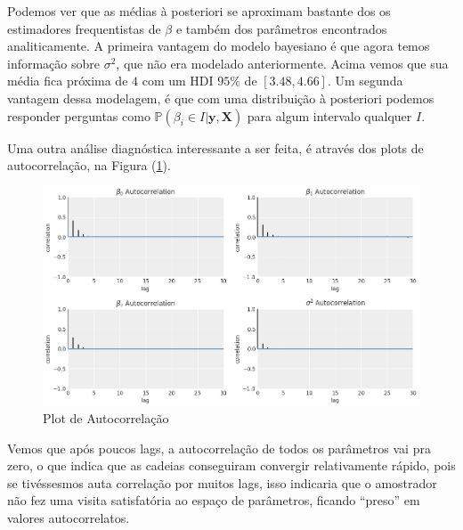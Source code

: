 \documentclass[12pt,letterpaper]{article}
\newcommand{\bd}[1]{\boldsymbol{#1}}
\begin{document}
	Podemos ver que as médias à posteriori se aproximam bastante dos os estimadores frequentistas de $\beta$ e também dos parâmetros encontrados analiticamente. A primeira vantagem do modelo bayesiano é que agora temos informação sobre $\sigma^2$, que não era modelado anteriormente. Acima vemos que sua média fica próxima de $4$ com um HDI $95\%$ de $[3.48,4.66]$. Um segunda vantagem dessa modelagem, é que com uma distribuição à posteriori podemos responder perguntas como $\mathbb{P}(\beta_i\in I|\bd y,\bd X)$ para algum intervalo qualquer $I$. 
	
	Uma outra análise diagnóstica interessante a ser feita, é através dos plots de autocorrelação, na Figura (\ref{autocorr1}).
	
	\begin{figure}[!htb]
		\centering
		\includegraphics[scale=0.5]{../images/autocorrelation1.png}
		
		\caption{Plot de Autocorrelação}
		\label{autocorr1}
	\end{figure}

	Vemos que após poucos lags, a autocorrelação de todos os parâmetros vai pra zero, o que indica que as cadeias conseguiram convergir relativamente rápido, pois se tivéssesmos auta correlação por muitos lags, isso indicaria que o amostrador não fez uma visita satisfatória ao espaço de parâmetros, ficando ``preso'' em valores autocorrelatos.
	
	
	\newpage
%		
	\printbibliography
\end{document}
